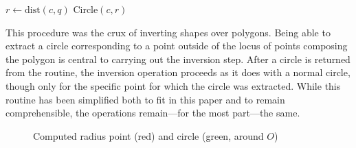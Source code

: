 \documentclass[a4paper,12pt]{article}
\numberwithin{figure}{section}
\begin{document}
\begin{algorithm}[H]
\begin{algorithmic}
                                \State $r \gets \text{dist}\left(c,q\right)$
                                \State \Return $\text{Circle}\left(c,r\right)$
                            \EndIf
                        \EndIf
                    \EndFor
                \EndFunction
            \end{algorithmic}
        \end{algorithm}
        
        This procedure was the crux of inverting shapes over polygons. Being able to extract a circle corresponding to a point outside of the locus of points composing the polygon is central to carrying out the inversion step. After a circle is returned from the routine, the inversion operation proceeds as it does with a normal circle, though only for the specific point for which the circle was extracted. While this routine has been simplified both to fit in this paper and to remain comprehensible, the operations remain---for the most part---the same.
        
        \begin{figure}[H]
            \centering
            \caption{Computed radius point (red) and circle (green, around $O$)}
            \label{fig:getcircle}
        \end{figure}
        
\end{document}
